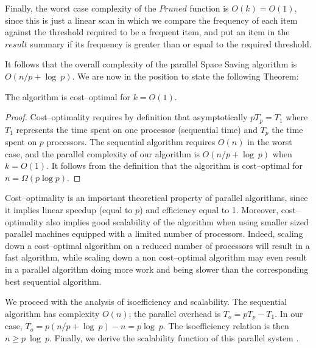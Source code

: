 \documentclass[final,3p,times]{elsarticle}
\begin{document}
Finally, the worst case complexity of the $Pruned$ function is $O(k) = O(1)$, since this is just a linear scan in which we compare the frequency of each item against the threshold required to be a frequent item, and put an item in the $result$  summary if its frequency is greater than or equal to the required threshold.

It follows that the overall  complexity of the parallel Space Saving algorithm is $O(n/p + \log~p)$. We are now in the position to state the following Theorem:

\begin{thm}
The algorithm is cost--optimal for $k = O(1)$.
\end{thm}

\begin{proof}
Cost--optimality requires by definition that asymptotically $pT_p = T_1$ where $T_1$  represents the time spent on one processor (sequential time) and $T_p$ the time spent on
$p$ processors. The sequential algorithm requires $O(n)$ in the worst case, and the parallel complexity of our algorithm is $O(n/p + \log~p)$ when $k = O(1)$. It follows from
the definition that the algorithm is cost--optimal for $n = \Omega(p \log p)$.
\end{proof}

Cost--optimality is an important theoretical property of parallel algorithms, since it implies linear speedup (equal to $p$) and efficiency equal to 1. Moreover,  cost--optimality also implies good scalability of the algorithm when using smaller sized parallel machines equipped with a limited number of processors. Indeed, scaling down a cost--optimal algorithm on a reduced number of processors will result in a fast algorithm, while scaling down a non cost--optimal algorithm may even result in a parallel algorithm doing more work and being slower than the corresponding best sequential algorithm. 

We proceed with the analysis of isoefficiency and scalability. The sequential algorithm has complexity $O(n)$; the parallel overhead is $T_o = pT_p - T_1$. In our case,  $T_o =
p(n/p + \log~p) - n =  p\log~p$.  The isoefficiency relation \cite{Grama93} is then $n \geq  p~\log~p$. Finally, we derive the scalability function of this parallel system
\cite{Quinn03}.
\end{document}
